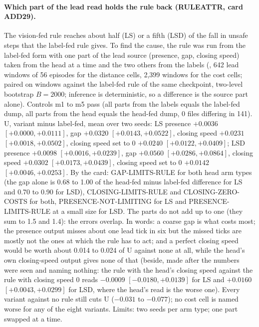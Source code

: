 \paragraph{Which part of the lead read holds the rule back (RULEATTR, card ADD29).} The vision-fed rule reaches about half (LS) or a fifth (LSD) of the fall in unsafe steps that the label-fed rule gives. To find the cause, the rule was run from the label-fed form with one part of the lead source (presence, gap, closing speed) taken from the head at a time and the two others from the labels (, 642 lead windows of 56 episodes for the distance cells, 2,399 windows for the cost cells; paired on windows against the label-fed rule of the same checkpoint, two-level bootstrap $B=2000$; inference is deterministic, so a difference is the source part alone). Controls m1 to m5 pass (all parts from the labels equals the label-fed dump, all parts from the head equals the head-fed dump, 0 files differing in 141). U, variant minus label-fed, mean over two seeds: LS presence $+0.0036$ $[+0.0000,+0.0111]$, gap $+0.0320$ $[+0.0143,+0.0522]$, closing speed $+0.0231$ $[+0.0018,+0.0502]$, closing speed set to 0 $+0.0240$ $[+0.0122,+0.0409]$; LSD presence $+0.0098$ $[+0.0016,+0.0239]$, gap $+0.0560$ $[+0.0286,+0.0864]$, closing speed $+0.0302$ $[+0.0173,+0.0439]$, closing speed set to 0 $+0.0142$ $[+0.0046,+0.0253]$. By the card: GAP-LIMITS-RULE for both head arm types (the gap alone is 0.68 to 1.00 of the head-fed minus label-fed difference for LS and 0.70 to 0.90 for LSD), CLOSING-LIMITS-RULE and CLOSING-ZERO-COSTS for both, PRESENCE-NOT-LIMITING for LS and PRESENCE-LIMITS-RULE at a small size for LSD. The parts do not add up to one (they sum to 1.5 and 1.4): the errors overlap. In words: a coarse gap is what costs most; the presence output misses about one lead tick in six but the missed ticks are mostly not the ones at which the rule has to act; and a perfect closing speed would be worth about 0.014 to 0.024 of U against none at all, while the head's own closing-speed output gives none of that (beside, made after the numbers were seen and naming nothing: the rule with the head's closing speed against the rule with closing speed 0 reads $-0.0009$ $[-0.0180,+0.0139]$ for LS and $+0.0160$ $[+0.0043,+0.0299]$ for LSD, where the head's read is the worse one). Every variant against no rule still cuts U ($-0.031$ to $-0.077$); no cost cell is named worse for any of the eight variants. Limits: two seeds per arm type; one part swapped at a time.

